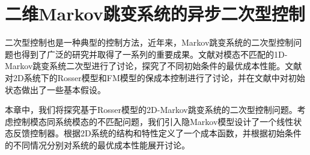 
\chapter{二维Markov跳变系统的异步二次型控制}
	二次型控制也是一种典型的控制方法，近年来，Markov跳变系统的二次型控制问题也得到了广泛的研究并取得了一系列的重要成果\cite{ji1990controllability,costa1999constrained,do2016quadratic}。文献\cite{zabala2019detector}对模态不匹配的1D-Markov跳变系统二次型进行了讨论，探究了不同初始条件的最优成本性能。文献\cite{guan2001robust,dhawan2007optimal,dhawan2010lmi}对2D系统下的Rosser模型和FM模型的保成本控制进行了讨论，并在文献中对初始状态做出了一些基本假设。
	
	本章中，我们将探究基于Rosser模型的2D-Markov跳变系统的二次型控制问题。考虑控制模态同系统模态的不匹配问题，我们引入隐Markov模型设计了一个线性状态反馈控制器。根据2D系统的结构和特性定义了一个成本函数，并根据初始条件的不同情况分别对系统的最优成本性能展开讨论。

